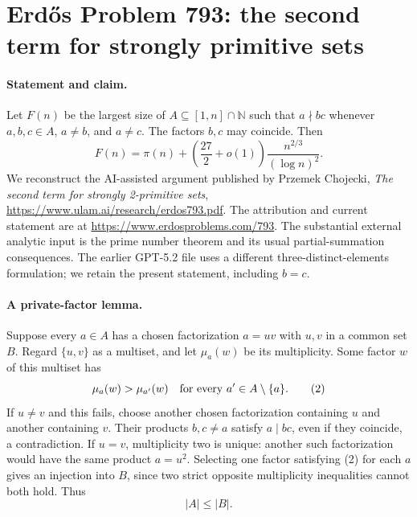 \section*{Erd\H{o}s Problem 793: the second term for strongly primitive sets}

\paragraph{Statement and claim.}
Let \(F(n)\) be the largest size of \(A\subseteq[1,n]\cap\mathbb N\)
such that \(a\nmid bc\) whenever \(a,b,c\in A\),
\(a\ne b\), and \(a\ne c\). The factors \(b,c\) may coincide.
Then
\[
 F(n)=\pi(n)+\left(\frac{27}{2}+o(1)\right)
                    \frac{n^{2/3}}{(\log n)^2}.
                                                               \tag{1}
\]
We reconstruct the AI-assisted argument published by
Przemek Chojecki, \emph{The second term for strongly
2-primitive sets},
\url{https://www.ulam.ai/research/erdos793.pdf}.
The attribution and current statement are at
\url{https://www.erdosproblems.com/793}.
The substantial external analytic input is the prime
number theorem and its usual partial-summation consequences.
The earlier GPT-5.2 file uses a different three-distinct-elements
formulation; we retain the present statement, including \(b=c\).

\paragraph{A private-factor lemma.}
Suppose every \(a\in A\) has a chosen factorization \(a=uv\)
with \(u,v\) in a common set \(B\). Regard \(\{u,v\}\)
as a multiset, and let \(\mu_a(w)\) be its multiplicity.
Some factor \(w\) of this multiset has
\[
 \mu_a(w)>\mu_{a'}(w)\quad\hbox{for every }a'\in A\setminus\{a\}.
                                                               \tag{2}
\]
If \(u\ne v\) and this fails, choose another chosen
factorization containing \(u\) and another containing \(v\).
Their products \(b,c\ne a\) satisfy \(a\mid bc\), even if
they coincide, a contradiction.
If \(u=v\), multiplicity two is unique: another such
factorization would have the same product \(a=u^2\).
Selecting one factor satisfying (2) for each \(a\)
gives an injection into \(B\), since two strict opposite
multiplicity inequalities cannot both hold. Thus
\[
 |A|\leq|B|.                                                   \tag{3}
\]

